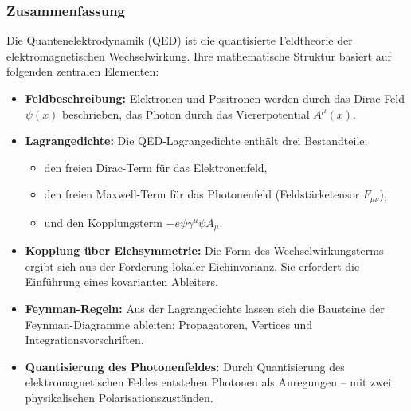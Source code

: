 \subsubsection{Zusammenfassung}

Die Quantenelektrodynamik (QED) ist die quantisierte Feldtheorie der elektromagnetischen Wechselwirkung. Ihre mathematische Struktur basiert auf folgenden zentralen Elementen:

\begin{itemize}
	\item \textbf{Feldbeschreibung:} Elektronen und Positronen werden durch das Dirac-Feld $\psi(x)$ beschrieben, das Photon durch das Viererpotential $A^\mu(x)$.
	
	\item \textbf{Lagrangedichte:} Die QED-Lagrangedichte enthält drei Bestandteile:
	\begin{itemize}
		\item den freien Dirac-Term für das Elektronenfeld,
		\item den freien Maxwell-Term für das Photonenfeld (Feldstärketensor $F_{\mu\nu}$),
		\item und den Kopplungsterm $-e \bar{\psi} \gamma^\mu \psi A_\mu$.
	\end{itemize}
	
	\item \textbf{Kopplung über Eichsymmetrie:} Die Form des Wechselwirkungsterms ergibt sich aus der Forderung lokaler Eichinvarianz. Sie erfordert die Einführung eines kovarianten Ableiters.
	
	\item \textbf{Feynman-Regeln:} Aus der Lagrangedichte lassen sich die Bausteine der Feynman-Diagramme ableiten: Propagatoren, Vertices und Integrationsvorschriften.
	
	\item \textbf{Quantisierung des Photonenfeldes:} Durch Quantisierung des elektromagnetischen Feldes entstehen Photonen als Anregungen – mit zwei physikalischen Polarisationszuständen.
	
\end{itemize}

